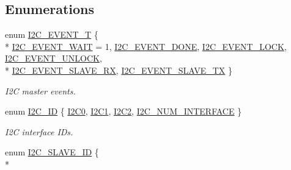 \subsection*{Enumerations}
\begin{DoxyCompactItemize}
\item 
enum \hyperlink{group__I2C__17XX__40XX_gacb2cd4e03ea48339d327e4f387441bf3}{I2\+C\+\_\+\+E\+V\+E\+N\+T\+\_\+T} \{ \\*
\hyperlink{group__I2C__17XX__40XX_ggacb2cd4e03ea48339d327e4f387441bf3a565d2f9e44285e1965deb390497f62ac}{I2\+C\+\_\+\+E\+V\+E\+N\+T\+\_\+\+W\+A\+IT} = 1, 
\hyperlink{group__I2C__17XX__40XX_ggacb2cd4e03ea48339d327e4f387441bf3a43d00f7d92100d4af6df5514e4ccf1d1}{I2\+C\+\_\+\+E\+V\+E\+N\+T\+\_\+\+D\+O\+NE}, 
\hyperlink{group__I2C__17XX__40XX_ggacb2cd4e03ea48339d327e4f387441bf3acec197aede70fe12008a68435bf5f339}{I2\+C\+\_\+\+E\+V\+E\+N\+T\+\_\+\+L\+O\+CK}, 
\hyperlink{group__I2C__17XX__40XX_ggacb2cd4e03ea48339d327e4f387441bf3aae6af45644ff5abf7016b5a8e8f41393}{I2\+C\+\_\+\+E\+V\+E\+N\+T\+\_\+\+U\+N\+L\+O\+CK}, 
\\*
\hyperlink{group__I2C__17XX__40XX_ggacb2cd4e03ea48339d327e4f387441bf3a290fcc1bb657102af26daa1b84472848}{I2\+C\+\_\+\+E\+V\+E\+N\+T\+\_\+\+S\+L\+A\+V\+E\+\_\+\+RX}, 
\hyperlink{group__I2C__17XX__40XX_ggacb2cd4e03ea48339d327e4f387441bf3a3911d9b6505f77f0bed3f21b2710ca58}{I2\+C\+\_\+\+E\+V\+E\+N\+T\+\_\+\+S\+L\+A\+V\+E\+\_\+\+TX}
 \}\begin{DoxyCompactList}\small\item\em I2C master events. \end{DoxyCompactList}
\item 
enum \hyperlink{group__I2C__17XX__40XX_gaec46000c6a1fe2c12c9a0c7ee3677626}{I2\+C\+\_\+\+ID} \{ \hyperlink{group__I2C__17XX__40XX_ggaec46000c6a1fe2c12c9a0c7ee3677626a8b606b29817406621b85b78b1ee9e653}{I2\+C0}, 
\hyperlink{group__I2C__17XX__40XX_ggaec46000c6a1fe2c12c9a0c7ee3677626aeb0f494c71f34592c5a4500ee98ab4a2}{I2\+C1}, 
\hyperlink{group__I2C__17XX__40XX_ggaec46000c6a1fe2c12c9a0c7ee3677626ae2cc6f0481e798aedb5fd5c6a2bfc01b}{I2\+C2}, 
\hyperlink{group__I2C__17XX__40XX_ggaec46000c6a1fe2c12c9a0c7ee3677626a84f3a2e3885474dda12c3d223eef5304}{I2\+C\+\_\+\+N\+U\+M\+\_\+\+I\+N\+T\+E\+R\+F\+A\+CE}
 \}\begin{DoxyCompactList}\small\item\em I2C interface I\+Ds. \end{DoxyCompactList}
\item 
enum \hyperlink{group__I2C__17XX__40XX_ga5fb1ba338fb3822bb6ca012adc4194bf}{I2\+C\+\_\+\+S\+L\+A\+V\+E\+\_\+\+ID} \{ \\*

\end{DoxyCompactItemize}

